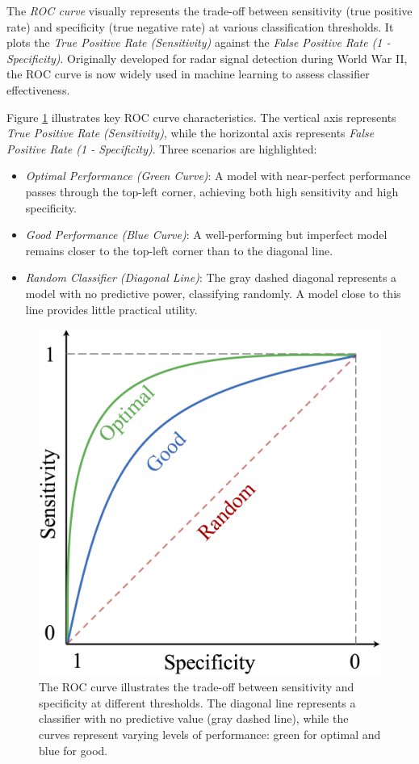 \documentclass[
  11pt,
]{book}
\providecommand{\tightlist}{%
  \setlength{\itemsep}{0pt}\setlength{\parskip}{0pt}}
\theoremstyle{definition}
\theoremstyle{definition}
\theoremstyle{definition}
\theoremstyle{definition}
\theoremstyle{remark}
\begin{document}
The \emph{ROC curve} visually represents the trade-off between sensitivity (true positive rate) and specificity (true negative rate) at various classification thresholds. It plots the \emph{True Positive Rate (Sensitivity)} against the \emph{False Positive Rate (1 - Specificity)}. Originally developed for radar signal detection during World War II, the ROC curve is now widely used in machine learning to assess classifier effectiveness.

Figure \ref{fig:roc-curve} illustrates key ROC curve characteristics. The vertical axis represents \emph{True Positive Rate (Sensitivity)}, while the horizontal axis represents \emph{False Positive Rate (1 - Specificity)}. Three scenarios are highlighted:

\begin{itemize}
\tightlist
\item
  \emph{Optimal Performance (Green Curve)}: A model with near-perfect performance passes through the top-left corner, achieving both high sensitivity and high specificity.\\
\item
  \emph{Good Performance (Blue Curve)}: A well-performing but imperfect model remains closer to the top-left corner than to the diagonal line.\\
\item
  \emph{Random Classifier (Diagonal Line)}: The gray dashed diagonal represents a model with no predictive power, classifying randomly. A model close to this line provides little practical utility.
\end{itemize}

\begin{figure}[H]

{\centering \includegraphics[width=0.6\linewidth]{images/ch8_roc-curve} 

}

\caption{The ROC curve illustrates the trade-off between sensitivity and specificity at different thresholds. The diagonal line represents a classifier with no predictive value (gray dashed line), while the curves represent varying levels of performance: green for optimal and blue for good.}\label{fig:roc-curve}
\end{figure}
\end{document}
